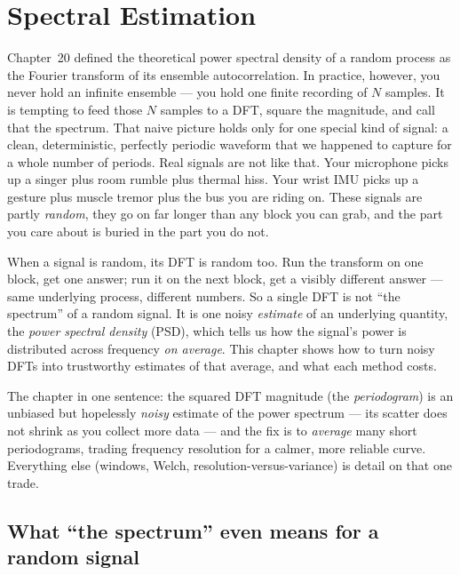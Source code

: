 \chapter{Spectral Estimation}

Chapter~20 defined the theoretical power spectral density of a random process as the
Fourier transform of its ensemble autocorrelation. In practice, however, you never hold
an infinite ensemble --- you hold one finite recording of $N$ samples. It is tempting to
feed those $N$ samples to a DFT, square the magnitude, and call that the spectrum. That naive picture holds only for one
special kind of signal: a clean, deterministic, perfectly periodic waveform
that we happened to capture for a whole number of periods. Real signals are not
like that. Your microphone picks up a singer plus room rumble plus thermal hiss.
Your wrist IMU picks up a gesture plus muscle tremor plus the bus you are riding
on. These signals are partly \emph{random}, they go on far longer than any block
you can grab, and the part you care about is buried in the part you do not.

When a signal is random, its DFT is random too. Run the transform on one block,
get one answer; run it on the next block, get a visibly different answer --- same
underlying process, different numbers. So a single DFT is not ``the spectrum'' of
a random signal. It is one noisy \emph{estimate} of an underlying quantity, the
\emph{power spectral density} (PSD), which tells us how the signal's power is
distributed across frequency \emph{on average}. This chapter shows how to turn
noisy DFTs into trustworthy estimates of that average, and what each method
costs.

\begin{focusbox}
The chapter in one sentence: the squared DFT magnitude (the \emph{periodogram})
is an unbiased but hopelessly \emph{noisy} estimate of the power spectrum --- its
scatter does not shrink as you collect more data --- and the fix is to
\emph{average} many short periodograms, trading frequency resolution for a calmer,
more reliable curve. Everything else (windows, Welch, resolution-versus-variance)
is detail on that one trade.
\end{focusbox}

\section{What ``the spectrum'' even means for a random signal}
\label{ch21:psd-meaning}

